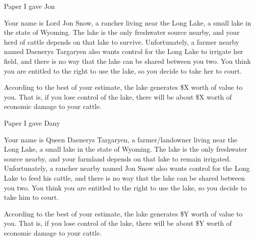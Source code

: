 \begin{frame}{Paper I gave Jon}
\protect\hypertarget{paper-i-gave-jon}{}

Your name is Lord Jon Snow, a rancher living near the Long Lake, a small
lake in the state of Wyoming. The lake is the only freshwater source
nearby, and your herd of cattle depends on that lake to survive.
Unfortunately, a farmer nearby named Daenerys Targaryen also wants
control for the Long Lake to irrigate her field, and there is no way
that the lake can be shared between you two. You think you are entitled
to the right to use the lake, so you decide to take her to court.

According to the best of your estimate, the lake generates \$X worth of
value to you. That is, if you lose control of the lake, there will be
about \$X worth of economic damage to your cattle.

\end{frame}

\begin{frame}{Paper I gave Dany}
\protect\hypertarget{paper-i-gave-dany}{}

Your name is Queen Daenerys Targaryen, a farmer/landowner living near
the Long Lake, a small lake in the state of Wyoming. The lake is the
only freshwater source nearby, and your farmland depends on that lake to
remain irrigated. Unfortunately, a rancher nearby named Jon Snow also
wants control for the Long Lake to feed his cattle, and there is no way
that the lake can be shared between you two. You think you are entitled
to the right to use the lake, so you decide to take him to court.

According to the best of your estimate, the lake generates \$Y worth of
value to you. That is, if you lose control of the lake, there will be
about \$Y worth of economic damage to your cattle.

\end{frame}


